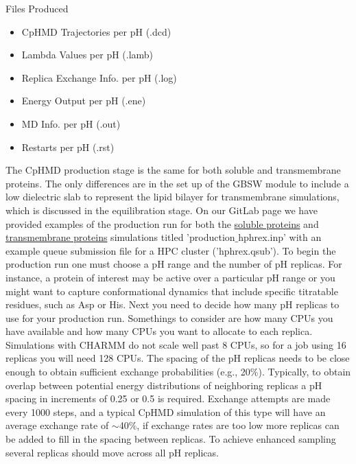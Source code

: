 \begin{checklist}{Files Produced}
\begin{itemize}
\item CpHMD Trajectories per pH (.dcd)
\item Lambda Values per pH (.lamb)
\item Replica Exchange Info. per pH (.log)
\item Energy Output per pH (.ene)
\item MD Info. per pH (.out)
\item Restarts per pH (.rst)
\end{itemize}
\end{checklist}

The CpHMD production stage is the same for both soluble and transmembrane proteins. 
The only differences are in the set up of the GBSW module to include a low dielectric slab to represent the lipid bilayer for transmembrane simulations, which is discussed in the equilibration stage.
On our GitLab page we have provided examples of the production run for both the \href{https://gitlab.com/shenlab-amber-cphmd/cphmd-tutorial/-/tree/main/hphmd_charmm/bbl_equil_prod}{soluble proteins} and \href{https://gitlab.com/shenlab-amber-cphmd/cphmd-tutorial/-/tree/main/memb_hphmd_charmm/prod}{transmembrane proteins} simulations titled 'production$\_$hphrex.inp' with an example queue submission file for a HPC cluster ('hphrex.qsub').
To begin the production run one must choose a pH range and the number of pH replicas. 
For instance, a protein of interest may be active over a particular pH range or you might want to capture conformational dynamics that include specific titratable residues, such as Asp or His. 
Next you need to decide how many pH replicas to use for your production run. 
Somethings to consider are how many CPUs you have available and how many CPUs you want to allocate to each replica. 
Simulations with CHARMM do not scale well past 8 CPUs, so for a job using 16 replicas you will need 128 CPUs. 
The spacing of the pH replicas needs to be close enough to obtain sufficient exchange probabilities (e.g., 20$\%$).
Typically, to obtain overlap between potential energy distributions of neighboring replicas a pH spacing in increments of 0.25 or 0.5 is required. 
Exchange attempts are made every 1000 steps, and a typical CpHMD simulation of this type will have an average exchange rate of $\sim$40$\%$, if exchange rates are too low more replicas can be added to fill in the spacing between replicas.
To achieve enhanced sampling several replicas should move across all pH replicas.
